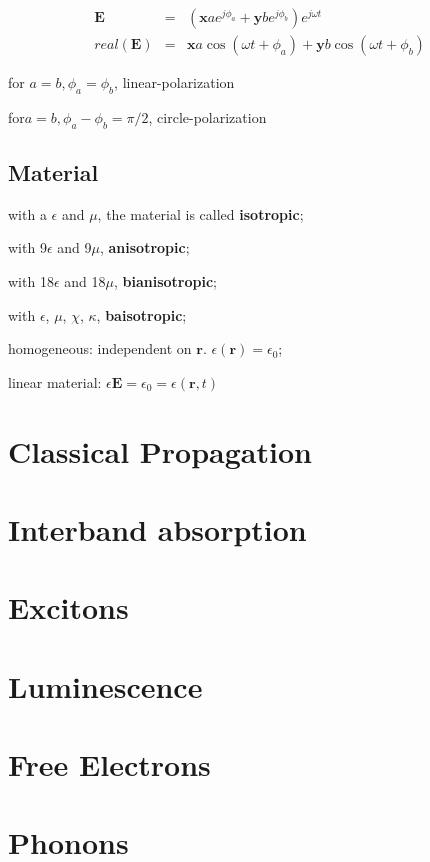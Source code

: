 \documentclass[12pt]{book} %
\begin{document}
\begin{eqnarray}
  \mathbf{E} &=& (\mathbf{x}ae^{j\phi_a}+\mathbf{y}be^{j\phi_b})e^{j\omega t}  \\
  real(\mathbf{E}) &=& \mathbf{x}a\cos(\omega t+\phi_a)+\mathbf{y}b\cos(\omega t+\phi_b)
\end{eqnarray}

for $a=b, \phi_a=\phi_b$, linear-polarization

for$a=b,\phi_a-\phi_b=\pi/2$, circle-polarization

\section{Material}

with a $\epsilon$ and $\mu$, the material is called \textbf{isotropic};

with 9$\epsilon$ and 9$\mu$, \textbf{anisotropic};

with 18$\epsilon$ and 18$\mu$, \textbf{bianisotropic};

with $\epsilon$, $\mu$, $\chi$, $\kappa$, \textbf{baisotropic};

homogeneous: independent on $\mathbf{r}$. $\epsilon(\mathbf{r})=\epsilon_0$;

linear material: $\epsilon{\mathbf{E}}=\epsilon_0=\epsilon(\mathbf{r},t)$



\chapter{Classical Propagation}
\chapter{Interband absorption}
\chapter{Excitons}
\chapter{Luminescence}
\chapter{Free Electrons}
\chapter{Phonons}
\end{document}
